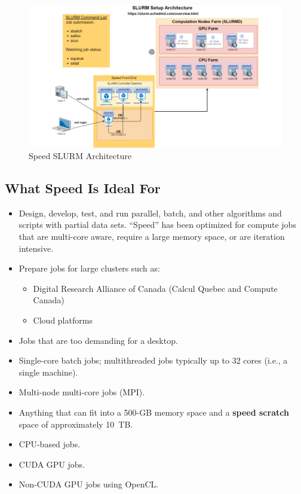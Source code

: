 \begin{figure}[htpb]
	\centering
	\includegraphics[width=\columnwidth]{images/slurm-arch}
	\caption{Speed SLURM Architecture}
	\label{fig:slurm-arch}
\end{figure}

\subsection{What Speed Is Ideal For}
\label{sect:speed-is-for}

\begin{itemize}
	\item
	Design, develop, test, and run parallel, batch, and other algorithms and scripts with partial data sets.
	``Speed'' has been optimized for compute jobs that are multi-core aware,
	require a large memory space, or are iteration intensive.

	\item
	Prepare jobs for large clusters such as:
		\begin{itemize}
			\item Digital Research Alliance of Canada (Calcul Quebec and Compute Canada)
			\item Cloud platforms
		\end{itemize}
	\item
	Jobs that are too demanding for a desktop.
	\item
	Single-core batch jobs; multithreaded jobs typically up to 32 cores (i.e., a single machine).
	\item
	Multi-node multi-core jobs (MPI).
	\item
	Anything that can fit into a 500-GB memory space and a \textbf{speed scratch} space of approximately 10~TB. 
	\item
	CPU-based jobs.
	\item
	CUDA GPU jobs.
	\item
	Non-CUDA GPU jobs using OpenCL.
\end{itemize}

